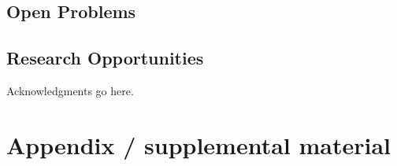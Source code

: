 \documentclass{article}
\begin{document}
\subsection{Open Problems}
\subsection{Research Opportunities}

\begin{ack}
Acknowledgments go here.
\end{ack}

\small





\appendix

\section{Appendix / supplemental material}


\newpage
\end{document}
